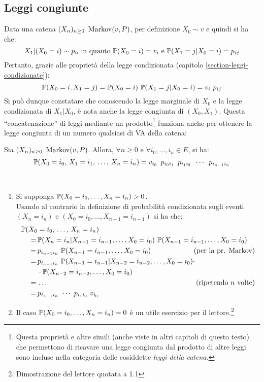 \subsection{Leggi congiunte}
Data una catena $(X_n)_{n \ge 0} \ \markov(v,P)$, per definizione $X_0 \sim v$ e quindi si ha che:
$$X_1 | (X_0 = i) \sim p_{i\bigcdot} \text{ in quanto } \PP(X_0 = i) = v_i \text{ e } \PP(X_1 = j | X_0 = i) = p_{ij}$$
Pertanto, grazie alle proprietà della legge condizionata (capitolo \ref{section-leggi-condizionate}):
$$\PP(X_0 = i, X_1 = j) = \PP(X_0 = i) \ \PP(X_1 = j | X_0 = i) = v_i \ p_{ij}$$
Si può dunque constatare che conoscendo la legge marginale di $X_0$ e la legge condizionata di $X_1|X_0$, è nota anche la legge congiunta di $(X_0, X_1)$.
Questa ``concatenazione'' di leggi mediante un prodotto\footnote{Questa proprietà e altre simili (anche viste in altri capitoli di questo testo) che permettono di ricavare una legge congiunta dal prodotto di altre leggi sono incluse nella categoria delle cosiddette \emph{leggi della catena.}}
funziona anche per ottenere la legge congiunta di un numero qualsiasi di VA della catena:

\begin{teo}\label{teo-legge-mark}
	Sia $(X_n)_{n \ge 0} \ \markov(v,P)$. Allora, $\forall n \ge 0$ e $\forall i_0,\dots,i_n \in E$, si ha:
	$$ \mathbb P(X_0=i_0, \, X_1=i_1, \, \dots, \, X_n=i_n) =
	v_{i_0} \ \, p_{i_0 i_1} \ \, p_{i_1 i_2} \ \, \cdots \ \, p_{i_{n-1} i_n} $$
\end{teo}
\begin{dimo}~
	\begin{enumerate}
		\item Si supponga $\mathbb P(X_0 = i_0, \dots, X_n = i_n) > 0$. \\
		Usando al contrario la definizione di probabilità condizionata sugli eventi $(X_n = i_n)$ e $(X_0 = i_0, \dots, X_{n-1} = i_{n-1})$ si ha che:
			\begin{align*}
				\PP(X_0 &= i_0, \, \dots, \, X_n = i_n) \\
				= \, & \PP(X_n = i_n | X_{n-1} = i_{n-1}, \dots, X_0 = i_0) \ \PP (X_{n-1} = i_{n-1}, \dots, X_0 = i_0) \\
				= \, & p_{i_{n-1} i_n} \ \PP (X_{n-1} = i_{n-1}, \dots, X_0 = i_0) &\mathmakebox[1pt][r]{\hfill\text{(per la pr. Markov)}} \\
				= \, & p_{i_{n-1} i_n} \ \PP(X_{n-1}=i_{n-1} | X_{n-2}=i_{n-2},\dots,X_0=i_0) \cdot\\
				  &\cdot \PP(X_{n-2}=i_{n-2},\dots,X_0=i_0) \\
				= \, & \dots &\mathmakebox[1pt][r]{\hfill\text{(ripetendo $n$ volte)}} \\
				= \, & p_{i_{n-1} i_n} \ \cdots \ p_{i_1 i_0} \ v_{i_0}
			\end{align*}
		\item Il caso $\mathbb P(X_0 = i_0, \dots, X_n = i_n) = 0$ è un utile esercizio per il lettore.\footnote{Dimostrazione del lettore quotata a 1.1} \qedhere
	\end{enumerate}
\end{dimo}

